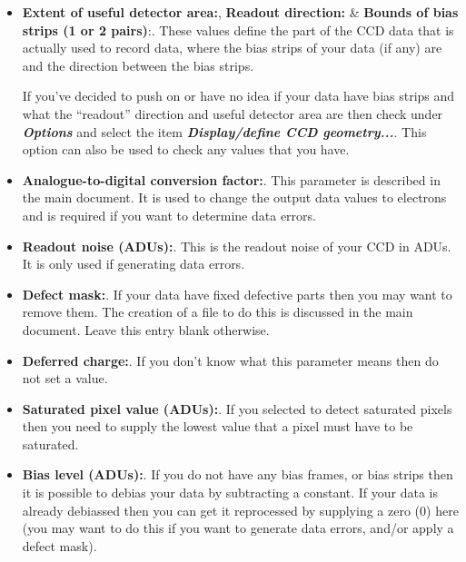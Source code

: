 \documentclass[11pt]{article}
\newcommand{\htmlref}[2]{#1}
\newcommand{\xref}[3]{#1}
\newcommand{\menu}[1]{{\bf \em #1}}
\newcommand{\wlab}[1]{{\bf #1}}
\begin{document}
\begin{itemize}
\item \wlab{Extent of useful detector area:}, \wlab{Readout direction:}
      \& \wlab{Bounds of bias strips (1 or 2 pairs)}:.
These values define the part of the CCD data that is actually used to
record data, where the bias strips of your data (if any) are and the
direction between the bias strips.

If you've decided to push on or have no idea if your data have bias
strips and what the ``readout'' direction and useful detector area are
then check under \menu{Options} and select the item
\htmlref{\menu{Display/define CCD geometry...}}{definegeometry}. This
option can also be used to check any values that you have.

\item \wlab{Analogue-to-digital conversion factor:}. This parameter is
\xref{described}{sun139}{CCDADC} in the main document. It is used to change
the output data values to electrons and is required if you want to
determine data errors.

\item \wlab{Readout noise (ADUs):}. This is the
\xref{readout noise}{sun139}{CCDrnoise} of your CCD in ADUs. It is only used
if generating data errors.

\item \wlab{Defect mask:}. If your data have fixed
defective parts then you may want to remove them. The creation of a
file to do this is \xref{discussed}{sun139}{datamasks} in the main
document. Leave this entry blank otherwise.

\item \wlab{Deferred charge:}. If you don't know what this parameter
\xref{means}{sun139}{CCDdeferred} then do not set a value.

\item \wlab{Saturated pixel value (ADUs):}. If you selected to detect
saturated pixels then you need to supply the lowest value that a pixel
must have to be saturated.

\item \wlab{Bias level (ADUs):}. If you do not have any bias frames, or
bias strips then it is possible to debias your data by subtracting a
constant. If your data is already debiassed then you can get it
reprocessed by supplying a zero (0) here (you may want to do this
if you want to generate data errors, and/or apply a defect mask).

\end{itemize}
\end{document}
